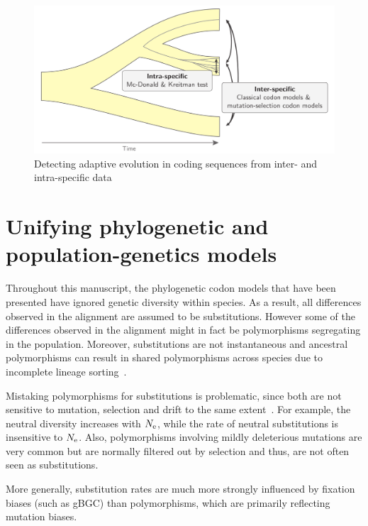 \begin{figure}[htbp]
    \centering
    \includegraphics[width=\textwidth] {figures/inter-intra}
    \caption{Detecting adaptive evolution in coding sequences from inter- and intra-specific data}
    \label{fig:detecting-adaptation-inter-intra}
\end{figure}

\section{Unifying phylogenetic and population-genetics models}
\label{sec:unifying-phylogenetic-and-population-genetics-model}

Throughout this manuscript, the phylogenetic codon models that have been presented have ignored genetic diversity within species.
As a result, all differences observed in the alignment are assumed to be substitutions.
However some of the differences observed in the alignment might in fact be polymorphisms segregating in the population.
Moreover, substitutions are not instantaneous and ancestral polymorphisms can result in shared polymorphisms across species due to incomplete lineage sorting~\citep{Charlesworth2010}.

Mistaking polymorphisms for substitutions is problematic, since both are not sensitive to mutation, selection and drift to the same extent~\citep{Mugal2014}.
For example, the neutral diversity increases with $N_{\text{e}}$, while the rate of neutral substitutions is insensitive to $N_{\text{e}}$.
Also, polymorphisms involving mildly deleterious mutations are very common but are normally filtered out by selection and thus, are not often seen as substitutions.

More generally, substitution rates are much more strongly influenced by fixation biases (such as gBGC) than polymorphisms, which are primarily reflecting mutation biases.

